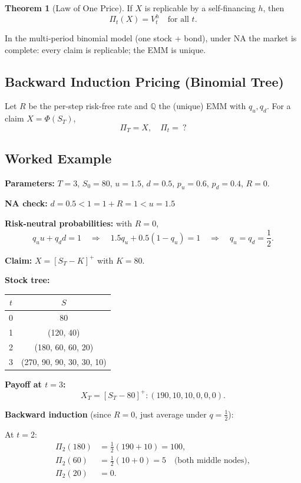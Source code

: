 \documentclass[12pt,a4paper]{article}
\theoremstyle{definition}
\newtheorem{theorem}{Theorem}[section]
\newcommand{\Q}{\mathbb{Q}}
\begin{document}
\begin{theorem}[Law of One Price]
If $X$ is replicable by a self-financing $h$, then
\[
\Pi_t(X) = V_t^h \quad \text{for all } t.
\]
\end{theorem}

In the multi-period binomial model (one stock + bond), under NA the market is complete: every claim is replicable; the EMM is unique.

\subsection{Backward Induction Pricing (Binomial Tree)}

Let $R$ be the per-step risk-free rate and $\Q$ the (unique) EMM with $q_u, q_d$. For a claim $X = \Phi(S_T)$,
\[
\Pi_T = X, \quad \Pi_t =\ ?
\]

\subsection{Worked Example}

\textbf{Parameters:} $T = 3$, $S_0 = 80$, $u = 1.5$, $d = 0.5$, $p_u = 0.6$, $p_d = 0.4$, $R = 0$.

\textbf{NA check:} $d = 0.5 < 1 = 1 + R = 1 < u = 1.5$

\textbf{Risk-neutral probabilities:} with $R = 0$,
\[
q_u u + q_d d = 1 \quad \Rightarrow \quad 1.5 q_u + 0.5(1 - q_u) = 1 \quad \Rightarrow \quad q_u = q_d = \frac{1}{2}.
\]

\textbf{Claim:} $X = [S_T - K]^+$ with $K = 80$.

\textbf{Stock tree:}
\begin{center}
\begin{tabular}{c|c}
$t$ & $S$ \\
\hline
0 & 80 \\
1 & (120, 40) \\
2 & (180, 60, 60, 20) \\
3 & (270, 90, 90, 30, 30, 10) \\
\end{tabular}
\end{center}

\textbf{Payoff at $t = 3$:}
\[
X_T = [S_T - 80]^+: (190, 10, 10, 0, 0, 0).
\]

\textbf{Backward induction} (since $R = 0$, just average under $q = \frac{1}{2}$):

At $t = 2$:
\begin{align}
\Pi_2(180) &= \frac{1}{2}(190 + 10) = 100, \\
\Pi_2(60) &= \frac{1}{2}(10 + 0) = 5 \quad \text{(both middle nodes)}, \\
\Pi_2(20) &= 0.
\end{align}
\end{document}
